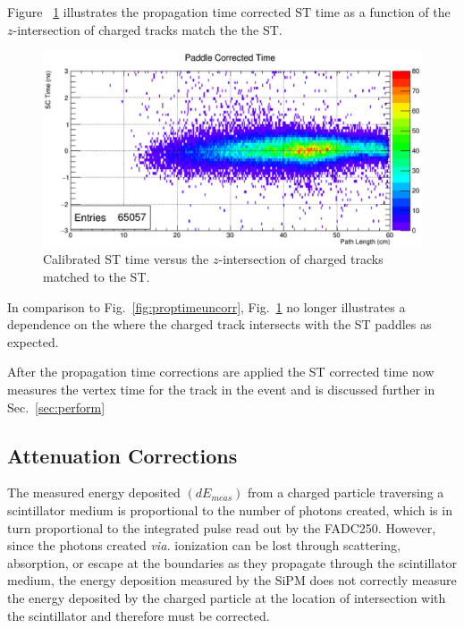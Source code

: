 Figure ~\ref{fig:proptimecorr} illustrates the propagation time corrected ST time as a function of the $z$-intersection of charged tracks match the the ST.
\begin{figure}[!htb]
	\centering
	\includegraphics[width=1.0\columnwidth]{performance/figs/prop_time_corr}
	\caption{Calibrated ST time versus the $z$-intersection of charged tracks matched to the ST.}
	\label{fig:proptimecorr}
\end{figure}
In comparison to Fig.~\ref{fig:proptimeuncorr}, Fig.~\ref{fig:proptimecorr} no longer illustrates a dependence on the where the charged track intersects with the ST paddles as expected.
	
After the propagation time corrections are applied the ST corrected time now measures the vertex time for the track in the event and is discussed further in Sec.~\ref{sec:perform}

\subsection{Attenuation Corrections} \label{sec:calib_ac}


The measured energy deposited $(dE_{meas})$ from a charged particle traversing a scintillator medium is proportional to the number of photons created, which is in turn proportional to the integrated pulse read out by the FADC250. However, since the photons created \textit{via.} ionization can be lost through scattering, absorption, or escape at the boundaries as they propagate through the scintillator medium, the energy deposition measured by the SiPM does not correctly measure the energy deposited by the charged particle at the location of intersection with the scintillator and therefore must be corrected.  


